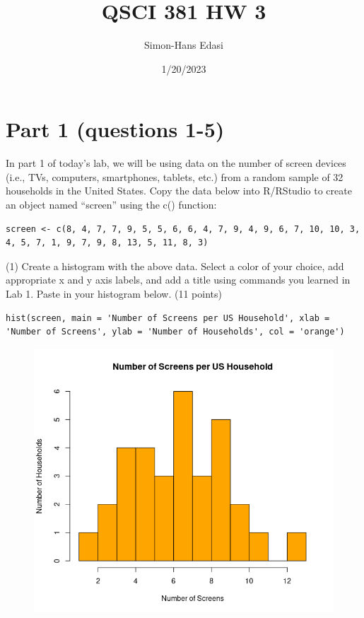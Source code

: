 \documentclass{article}
\title{QSCI 381 HW 3}
\date{1/20/2023}
\author{Simon-Hans Edasi}
\begin{document}
	\maketitle



\section{Part 1 (questions 1-5)}








In part 1 of today’s lab, we will be using data on the number of screen devices (i.e., TVs, computers, smartphones, tablets, etc.) from a random sample of 32 households in the United States. Copy the data below into R/RStudio to create an object named “screen” using the c() function:

\begin{center}
\begin{lstlisting}
screen <- c(8, 4, 7, 7, 9, 5, 5, 6, 6, 4, 7, 9, 4, 9, 6, 7, 10, 10, 3, 4, 5, 7, 1, 9, 7, 9, 8, 13, 5, 11, 8, 3)
\end{lstlisting}
\end{center}
(1) Create a histogram with the above data. Select a color of your choice, add appropriate x and y axis labels, and add a title using commands you learned in Lab 1. Paste in your histogram below. (11 points)
\begin{center}
\begin{lstlisting}
hist(screen, main = 'Number of Screens per US Household', xlab = 'Number of Screens', ylab = 'Number of Households', col = 'orange')
\end{lstlisting}
\begin{figure}[H]
    \includegraphics[scale = 0.75]{screens_histogram.png}
\end{figure}
\end{center}
\end{document}
